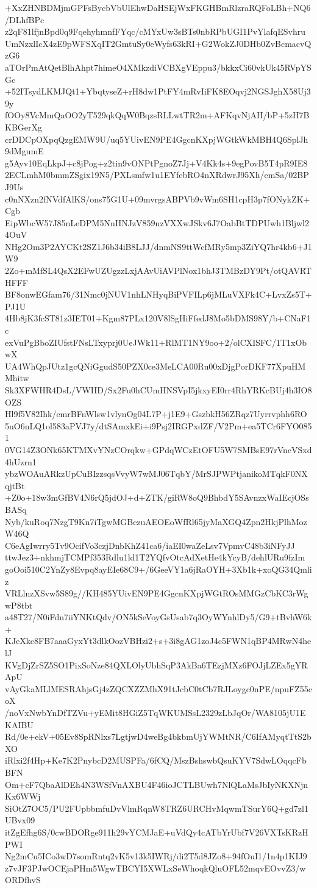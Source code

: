 +XxZHNBDMjmGPFsBycbVbUlEhwDaHSEjWxFKGHBmRlzraRQFoLBh+NQ6/DLhfBPc
z2qF81lfjnBpd0q9FqehyhmnfFYqc/cMYxUw3sBTs0nbRPbUGI1PvYlafqESvhru
UmNzxlIcX4zE9pWFSXqIT2GmtuSy0eWyfs63kRI+G2WokZJ0DHb0ZvBcmacvQzG6
aTOrPmAtQetBlhAhpt7himeO4XMkzdiVCBXgVEppu3/bkkxCi60vkUk45RVpYSGc
+52ITsydLKMJQt1+YbqtyseZ+rH8dw1PtFY4mRvIiFK8EOqvj2NGSJghX58Uj39y
fOOy8VcMmQaOO2yT529qkQqW0BqzsRLLwtTR2m+AFKqvNjAH/bP+5zH7BKBGerXg
crDDCpOXpqQzgEMW9U/uq5YUivEN9PE4GgcnKXpjWGtkWkMBH4Q6SplJh9dMgumE
g5Ayv10EqLkpJ+c8jPog+z2tin9vONPtPgnoZ7Jj+V4Kk4s+9egPovB5T4pR9IE8
2ECLmhM0bmmZSgix19N5/PXLsmfw1u1EYfebRO4nXRdwrJ95Xh/emSa/02BPJ9Us
c0nNXzn2fNVdfAlKS/ons75G1U+09mvrgsABPVb9vWm6SH1cpH3p7fONykZK+Cgb
EipWbcW57J85nLeDPM5NnHNJzV859nzVXXwJSkv6J7OabBtTDPUwh1Bljwl24OuV
NHg2Om3P2AYCKt2SZ1J6b34iB8LJJ/dnmNS9ttWcfMRy5mp3ZiYQ7hr4kb6+J1W9
2Zo+mMfSL4QsX2EFwUZUgzzLxjAAvUiAVPlNox1bhJ3TMBzDY9Pt/otQAVRTHFFF
BF8onwEGfam76/31Nmc0jNUV1nhLNHyqBiPVFILp6jMLuVXFk4C+LvxZs5T+PJ1U
4Hb8jK3fcST81z3IET01+Kgm87PLx120V8lSgHiFfedJ8Mo5bDMS98Y/b+CNaF1c
exVuPgBboZIUfstFNsLTxyprj0UeJWk11+RlMT1NY9oo+2/olCXISFC/1T1xObwX
UA4WhQpJUtz1gcQNiGgudS50PZX0ce3MeLCA00Ru00xDjgPorDKF77XpuHMMhitw
Sk3XFWHR4DsL/VWIID/Sx2Fu0hCUmHNSVpI5jkxyEI0rr4RhYRKcBUj4h3IO8OZS
Hl9f5V82Ihk/emrBFnWlsw1vlynOg04L7P+j1E9+GszbkH56ZRqz7Uyrrvphh6RO
5uO6nLQ1ol583aPVJ7y/dtSAmxkEi+i9Psj2IRGPxdZF/V2Pm+ea5TCr6FYO0851
0VG14Z3ONk65KTMXvYNzCOrqkw+GPdqWCzEtOFU5W7SMBsE97rVncVSxd4hUzrn1
ybzWOAuARkzUpCuBIzzsqsVvyW7wMJ06TqbY/MrSJPWPtjanikoMTqkF0NXqjtBt
+Z0o+18w3mGfBV4N6rQ5jdOJ+d+ZTK/giRW8oQ9BhbdY5SAvnzxWaIEcjOSsBASq
Nyb/kuRoq7NzgT9Kn7iTgwMGBczuAEOEoWfRl65jyMaXGQ4Zpn2HkjPlhMozW46Q
C6eAgIwrry5Tv9OcifVo3czjDnbKhZ41ca6/iaEI0waZeLsv7VpmvC48b3iNFyJJ
ttwJez3+nkhmjTCMPf353Rdlu1ld1T2YQfvOtcAdXetHe4kYcyB/dehlURu9fzIm
goOoi510C2YnZy8Evpq8ayEIe68C9+/6GeeVY1a6jRaOYH+3Xb1k+xoQG34Qmliz
VRLlnzXSvw5S89g//KH485YUivEN9PE4GgcnKXpjWGtROsMMGzCbKC3rWgwP8tbt
a48T27/N0iFdn7iiYNKtQdv/ON5kSeVoyGsUsab7q3OyWYnhlDy5/G9+tBvhW6k+
KJeXkc8FB7aaaGyxYt3dlkOozVBHzi2+s+3i8gAG1zoJ4c5FWN1qBP4MRwN4helJ
KVgDjZrSZ5SO1PixSoNze84QXLOlyUbhSqP3AkBa6TEzjMXz6FOJjLZEx5gYRApU
vAyGkaMLlMESRAhjsGj4zZQCXZZMhX91tJcbC0tCb7RJLoygc0nPE/npuFZ55coX
/noVxNwbYnDfTZVu+yEMit8HGiZ5TqWKUMSsL2329zLbJqOr/WA8105jU1EKAIBU
Rd/0e+ekV+05Ev8SpRNlxs7LgtjwD4weBg4bkbmUjYWMtNR/C6IfAMyqtTtS2bXO
iRlxi2f4Hp+Ke7K2PnybcD2MUSPFa/6fCQ/MszBshswbQsuKYV7SdwLOqqcFbBFN
Om+cF7QbaAlDEh4N3WSfVnAXBU4F46ioJCTLBUwh7NlQLaMsJbIyNKXNjnKx6WWj
SiOtZ7OC5/PU2FUpbbmfuDvVlmRqnW8TRZ6URCHvMqwmTSurY6Q+gd7zl1UBvx09
itZgEfhg6S/0cwBDORge911h29vYCMJaE+uVdQy4cATbYrUbf7V26VXTsKRzHPWI
Ng2mCu5ICo3wD7somRntq2vK5v13k5IWRj/di2T5d8JZo8+94fOuI1/1n4p1KIJ9
z7vJF3PJwOCEjaPHm5WgwTBCYI5XWLxSeWhoqkQluOFL52mqvEOvvZ3/wORDfhvS
